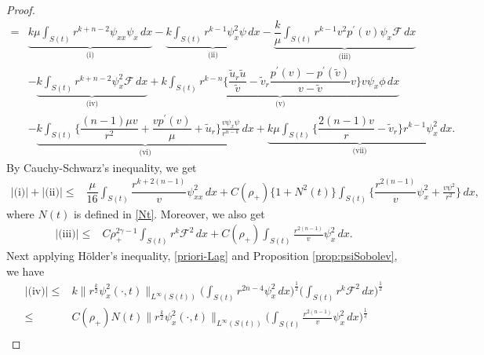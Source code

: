 \documentclass[a4paper,12pt,draft]{article}
\theoremstyle{remark}
\def\ut{\tilde{u}}
\def\vt{\tilde{v}}
\def\mF{\mathcal{F}}
\begin{document}
\begin{proof}
\begin{align*}
        =& \underbrace{k\mu \int_{S(t)}\!\! r^{k+n-2} \psi_{xx} \psi_x \, dx}_{\textrm{(i)}} -\underbrace{k\int_{S(t)}\!\! r^{k-1} \psi_x^2 \psi \, dx}_{\textrm{(ii)}} -\underbrace{\dfrac{k}{\mu}\int_{S(t)} r^{k-1} v^2 p^{\prime}(v) \psi_x \mF\, dx}_{\textrm{(iii)}} \\
        & - \underbrace{k\int_{S(t)}\!\! r^{k+n-2} \psi_x^2 \mF\, dx}_{\textrm{(iv)}} + \underbrace{k \int_{S(t)}\!\! r^{k-n} \Big\{ \dfrac{\ut_r \ut}{\vt} - \vt_r \dfrac{p^{\prime}(v)-p^{\prime}(\vt)}{v-\vt} v \Big\}  v \psi_x \phi\, dx}_{\textrm{(v)}} \\
        & -\underbrace{k\int_{S(t)}\!\!\!\Big\{ \dfrac{(n-1)\mu v}{r^2} + \dfrac{v p^{\prime}(v)}{\mu} + \ut_r \Big\} \frac{v \psi_x \psi}{r^{n-k}}\, dx}_{\textrm{(vi)}} + \underbrace{k\mu \int_{S(t)}\!\!\! \big\{ \dfrac{2(n-1)v}{r} - \vt_r  \big\} r^{k-1} \psi_x^2 \, dx}_{\textrm{(vii)}}.
    \end{align*}
    By Cauchy-Schwarz's inequality, we get
    \begin{align*}
        |\textrm{(i)}|+|\textrm{(ii)}| \le& \dfrac{\mu}{16}\! \int_{S(t)}\!\!\! \dfrac{r^{k+2(n-1)}}{v}\psi_{xx}^2\, dx +  C(\rho_{+})\{1+N^2(t)\}\! \int_{S(t)}\!\! \Big\{ \dfrac{r^{2(n-1)}}{v} \psi_x^2 + \frac{v \psi^2}{r^2} \Big\}\, dx, 
    \end{align*}
    where $N(t)$ is defined in \eqref{Nt}. Moreover, we also get
    \begin{align*}
       |\textrm{(iii)}| %
       \le & C\rho_{+}^{2\gamma-1} \int_{S(t)} r^k \mF^2 \, dx + C(\rho_{+}) \int_{S(t)} \frac{r^{2(n-1)}}{v} \psi_x^2 \, dx. 
    \end{align*}
    Next applying H\"older's inequality, \eqref{priori-Lag} and Proposition \ref{prop:psiSobolev}, we have
    \begin{align*}
        |\textrm{(iv)}| \le&  k \| r^{\frac{k}{2}} \psi_x^2(\cdot,t) \|_{L^{\infty}(S(t))}\bigg(\int_{S(t)}\!\! r^{2n-4} \psi_x^2\, dx\bigg)^{\frac{1}{2}} \bigg(\int_{S(t)}\!\! r^{k}\mF^2 \, dx\bigg)^{\frac{1}{2}}\\
        \le & C(\rho_{+}) N(t)  \| r^{\frac{k}{2}} \psi_x^2(\cdot,t) \|_{L^{\infty}(S(t))} \bigg(\int_{S(t)}\!\! \frac{r^{2(n-1)}}{v}\psi_x^2 \, dx\bigg)^{\frac{1}{2}}\\

\end{align*}
\end{proof}
\end{document}
